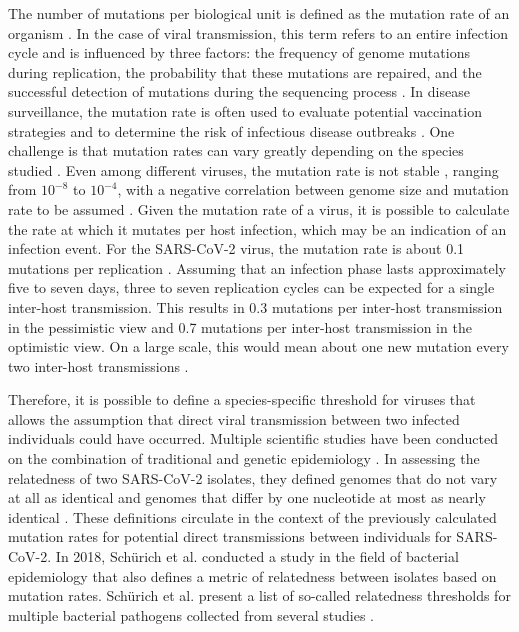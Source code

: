 The number of mutations per biological unit is defined as the mutation rate of an organism \cite{Pie1}. In the case of viral transmission, this term refers to an entire infection cycle and is influenced by three factors: the frequency of genome mutations during replication, the probability that these mutations are repaired, and the successful detection of mutations during the sequencing process \cite{Pie1}. In disease surveillance, the mutation rate is often used to evaluate potential vaccination strategies and to determine the risk of infectious disease outbreaks \cite{San1}. One challenge is that mutation rates can vary greatly depending on the species studied \cite{Pie1}. Even among different viruses, the mutation rate is not stable \cite{Ami1}, ranging from $10^{-8}$ to $10^{-4}$, with a negative correlation between genome size and mutation rate to be assumed \cite{San1}. Given the mutation rate of a virus, it is possible to calculate the rate at which it mutates per host infection, which may be an indication of an infection event. For the SARS-CoV-2 virus, the mutation rate is about 0.1 mutations per replication \cite{Ami1}. Assuming that an infection phase lasts approximately five to seven days, three to seven replication cycles can be expected for a single inter-host transmission. This results in 0.3 mutations per inter-host transmission in the pessimistic view and 0.7 mutations per inter-host transmission in the optimistic view. On a large scale, this would mean about one new mutation every two inter-host transmissions \cite{Con1}.

Therefore, it is possible to define a species-specific threshold for viruses that allows the assumption that direct viral transmission between two infected individuals could have occurred. Multiple scientific studies have been conducted on the combination of traditional and genetic epidemiology \cite{Wal1, Wal2}. In assessing the relatedness of two SARS-CoV-2 isolates, they defined genomes that do not vary at all as identical and genomes that differ by one nucleotide at most as nearly identical \cite{Wal1}. These definitions circulate in the context of the previously calculated mutation rates for potential direct transmissions between individuals for SARS-CoV-2. In 2018, Schürich et al. conducted a study in the field of bacterial epidemiology that also defines a metric of relatedness between isolates based on mutation rates. Schürich et al. present a list of so-called relatedness thresholds for multiple bacterial pathogens collected from several studies \cite{Sch1}.


